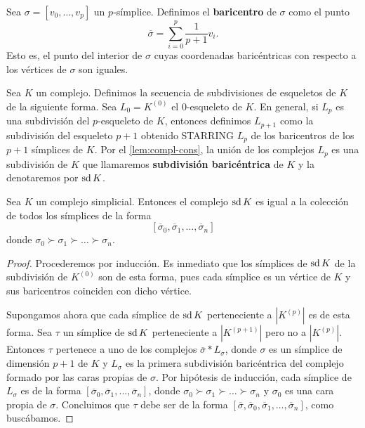 \begin{definicion}
	Sea $\sigma = [v_0, \dots, v_p]$ un $p$-símplice. Definimos el \textbf{baricentro} de $\sigma$ como el punto
	\[
		\overline{\sigma} = \sum_{i=0}^{p}\frac{1}{p+1} v_i.
	\]
	Esto es, el punto del interior de $\sigma$ cuyas coordenadas baricéntricas con respecto a los vértices de $\sigma$ son iguales.
\end{definicion}
\begin{definicion}
	Sea $K$ un complejo. Definimos la secuencia de subdivisiones de esqueletos de $K$ de la siguiente forma. Sea $L_0 = K^{(0)}$ el $0$-esqueleto de $K$. En general, si $L_p$ es una subdivisión del $p$-esqueleto de $K$, entonces definimos $L_{p+1}$ como la subdivisión del esqueleto $p+1$ obtenido STARRING $L_p$ de los baricentros de los $p+1$ símplices de $K$. Por el \autoref{lem:compl-cons}, la unión de los complejos $L_p$ es una subdivisión de $K$ que llamaremos \textbf{subdivisión baricéntrica} de $K$ y la denotaremos por $\operatorname{sd} K$.
\end{definicion}
\begin{lema}
	Sea $K$ un complejo simplicial. Entonces el complejo $\operatorname{sd} K$ es igual a la colección de todos los símplices de la forma
	\[
		[\overline{\sigma}_0,\overline{\sigma}_1,\dots,\overline{\sigma}_n]
	\]
	donde $\sigma_0 \succ \sigma_1 \succ \dots \succ \sigma_n$.
\end{lema}
\begin{proof}
	Procederemos por inducción. Es inmediato que los símplices de $\operatorname{sd} K$ de la subdivisión de $K^{(0)}$ son de esta forma, pues cada símplice es un vértice de $K$ y sus baricentros coinciden con dicho vértice.

	Supongamos ahora que cada símplice de $\operatorname{sd} K$ perteneciente a $|K^{(p)}|$ es de esta forma. Sea $\tau$ un símplice de $\operatorname{sd} K$ perteneciente a $|K^{(p+1)}|$ pero no a $|K^{(p)}|$. Entonces $\tau$ pertenece a uno de los complejos $\overline{\sigma} \ast L_{\sigma}$, donde $\sigma$ es un símplice de dimensión $p+1$ de $K$ y $L_{\sigma}$ es la primera subdivisión baricéntrica del complejo formado por las caras propias de $\sigma$. Por hipótesis de inducción, cada símplice de $L_{\sigma}$ es de la forma $[\overline{\sigma}_0,\overline{\sigma}_1,\dots,\overline{\sigma}_n]$, donde $\sigma_0 \succ \sigma_1 \succ \dots \succ \sigma_n$ y $\sigma_0$ es una cara propia de $\sigma$. Concluimos que $\tau$ debe ser de la forma $[\overline{\sigma},\overline{\sigma}_0,\overline{\sigma}_1,\dots,\overline{\sigma}_n]$, como buscábamos.
\end{proof}

